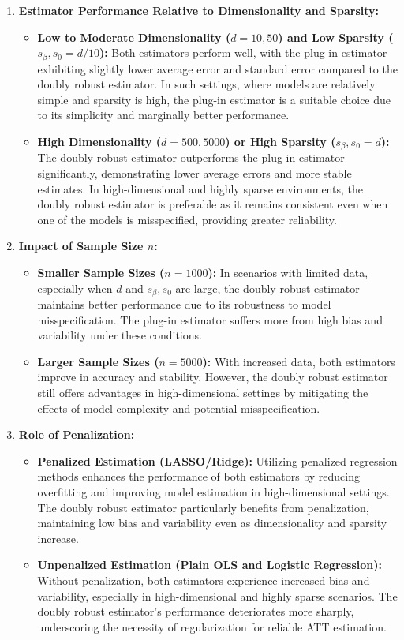 \documentclass{article}
\begin{document}
\begin{enumerate}
  \item \textbf{Estimator Performance Relative to Dimensionality and Sparsity:}
    \begin{itemize}
      \item \textbf{Low to Moderate Dimensionality (\( d = 10, 50 \)) and Low Sparsity (\( s_\beta, s_0 = d/10 \)):} Both estimators perform well, with the plug-in estimator exhibiting slightly lower average error and standard error compared to the doubly robust estimator. In such settings, where models are relatively simple and sparsity is high, the plug-in estimator is a suitable choice due to its simplicity and marginally better performance.
      \item \textbf{High Dimensionality (\( d = 500, 5000 \)) or High Sparsity (\( s_\beta, s_0 = d \)):} The doubly robust estimator outperforms the plug-in estimator significantly, demonstrating lower average errors and more stable estimates. In high-dimensional and highly sparse environments, the doubly robust estimator is preferable as it remains consistent even when one of the models is misspecified, providing greater reliability.
    \end{itemize}

  \item \textbf{Impact of Sample Size \( n \):}
    \begin{itemize}
      \item \textbf{Smaller Sample Sizes (\( n = 1000 \)):} In scenarios with limited data, especially when \( d \) and \( s_\beta, s_0 \) are large, the doubly robust estimator maintains better performance due to its robustness to model misspecification. The plug-in estimator suffers more from high bias and variability under these conditions.
      \item \textbf{Larger Sample Sizes (\( n = 5000 \)):} With increased data, both estimators improve in accuracy and stability. However, the doubly robust estimator still offers advantages in high-dimensional settings by mitigating the effects of model complexity and potential misspecification.
    \end{itemize}

  \item \textbf{Role of Penalization:}
    \begin{itemize}
      \item \textbf{Penalized Estimation (LASSO/Ridge):} Utilizing penalized regression methods enhances the performance of both estimators by reducing overfitting and improving model estimation in high-dimensional settings. The doubly robust estimator particularly benefits from penalization, maintaining low bias and variability even as dimensionality and sparsity increase.
      \item \textbf{Unpenalized Estimation (Plain OLS and Logistic Regression):} Without penalization, both estimators experience increased bias and variability, especially in high-dimensional and highly sparse scenarios. The doubly robust estimator's performance deteriorates more sharply, underscoring the necessity of regularization for reliable ATT estimation.
    \end{itemize}


\end{enumerate}
\end{document}
